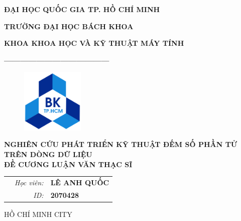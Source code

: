 \documentclass[letterpaper,13pt]{article}
\theoremstyle{mytheor}
\begin{document}
\begin{titlepage}
\begin{center} {\textbf{ĐẠI HỌC QUỐC GIA TP. HỒ CHÍ MINH}
}

{\textbf{TRƯỜNG ĐẠI HỌC BÁCH KHOA}
}

{\textbf{KHOA KHOA HỌC VÀ KỸ THUẬT MÁY TÍNH }
}

{\textbf{---------------------------------------}}

\end{center}

\vspace{1cm}

\begin{figure}[h!]
\begin{center}
\includegraphics[width=3cm]{hcmut.png}
\end{center}
\end{figure}

\vspace{2cm}


\begin{center}
\textbf{\Large NGHIÊN CỨU PHÁT TRIỂN KỸ THUẬT ĐẾM SỐ PHẦN TỬ \\TRÊN DÒNG DỮ LIỆU}
\vspace{1.5cm}
\\
\textbf{\Large ĐỀ CƯƠNG LUẬN VĂN THẠC SĨ}
\end{center}

\vspace{3cm}

\begin{table}[h]
\begin{tabular}{rrl}
\hspace{5.1cm} 
&\textit{Học viên: } & \textbf{LÊ ANH QUỐC}\\
&\textit{ID: } & \textbf{2070428}\\

\end{tabular}
\end{table}
\vspace{3cm}
\begin{center}
{\footnotesize HỒ CHÍ MINH CITY}
\end{center}
\end{titlepage}
\end{document}
